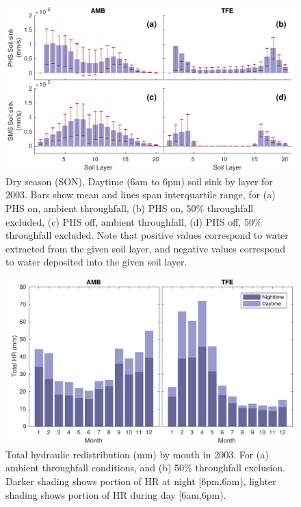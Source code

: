\documentclass[draft,linenumbers]{agujournal}
\begin{document}
        \clearpage
    \begin{figure}[h]
     \centering
     \includegraphics[width=30pc]{../figs2/fig7.pdf}
     \caption{Dry season (SON), Daytime (6am to 6pm) soil sink by layer for 2003. 
     Bars show mean and lines span interquartile range, for 
     (a) PHS on, ambient throughfall,
     (b) PHS on, 50\% throughfall excluded,
     (c) PHS off, ambient throughfall,
     (d) PHS off, 50\% throughfall excluded. 
     Note that positive values correspond to water extracted from the given soil layer, 
     and negative values correspond to water deposited into the given soil layer.}
     \label{fig7}
  \end{figure}
  

  
    \clearpage
    \begin{figure}[h]
     \centering
     \includegraphics[width=30pc]{../figs2/fig9.pdf}
     \caption{Total hydraulic redistribution (mm) by month in 2003. For (a) ambient throughfall conditions, and (b) 50\% throughfall exclusion. 
     Darker shading shows portion of HR at night [6pm,6am), lighter shading shows portion of HR during day [6am,6pm).}
     \label{fig9}
  \end{figure}
  
\end{document}
